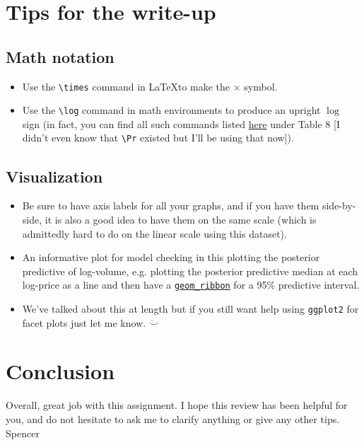 \documentclass[11pt]{article}
\begin{document}
\section{Tips for the write-up}

\subsection{Math notation}

\begin{itemize}
	\item Use the \texttt{\textbackslash times} command in \LaTeX to make the $\times$ symbol. 
	\item Use the \texttt{\textbackslash log} command in math environments to produce an upright $\log$ sign (in fact, you can find all such commands listed \href{http://web.ift.uib.no/Teori/KURS/WRK/TeX/symALL.html}{here} under Table 8 [I didn't even know that \texttt{\textbackslash Pr} existed but I'll be using that now]).
\end{itemize}

\subsection{Visualization}

\begin{itemize}
	\item Be sure to have axis labels for all your graphs, and if you have them side-by-side, it is also a good idea to have them on the same scale (which is admittedly hard to do on the linear scale using this dataset).
	\item An informative plot for model checking in this plotting the posterior predictive of log-volume, e.g. plotting the posterior predictive median at each log-price as a line and then have a \href{http://ggplot2.tidyverse.org/reference/geom_ribbon.html}{\texttt{geom\_ribbon}} for a 95\% predictive interval.
	\item We've talked about this at length but if you still want help using \texttt{ggplot2} for facet plots just let me know. $\ddot\smile$
\end{itemize}

\section{Conclusion}

Overall, great job with this assignment. I hope this review has been helpful for you, and do not hesitate to ask me to clarify anything or give any other tips. \\

Spencer
\end{document}
